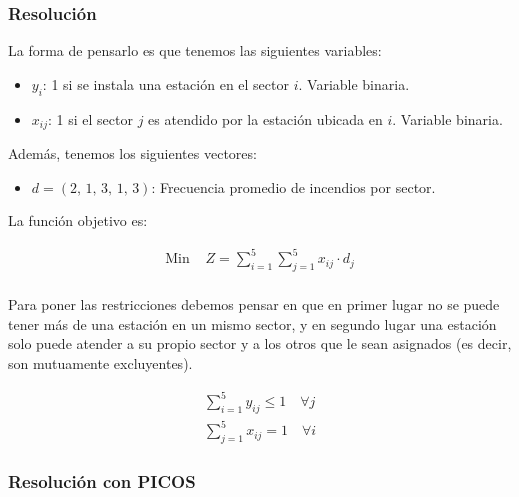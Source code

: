 \documentclass[12pt]{article}
\begin{document}
\subsubsection{Resolución}

La forma de pensarlo es que tenemos las siguientes variables:

\begin{itemize}[label=$\rightarrow$]
    \item $y_i$: 1 si se instala una estación en el sector $i$. Variable binaria.
    \item $x_{ij}$: 1 si el sector $j$ es atendido por la estación ubicada en $i$. Variable binaria.
\end{itemize}

Además, tenemos los siguientes vectores:

\begin{itemize}[label=$\rightarrow$]
    \item $d = (2,\,1,\,3,\,1,\,3)$: Frecuencia promedio de incendios por sector.
\end{itemize}

La función objetivo es:

\begin{align*}
    \text{Min } & Z = \sum_{i=1}^{5} \sum_{j=1}^{5} x_{ij} \cdot d_j \\
\end{align*}

Para poner las restricciones debemos pensar en que en primer lugar no se puede tener más de una estación en un mismo sector, y en segundo lugar una estación solo puede atender a su propio sector y a los otros que le sean asignados (es decir, son mutuamente excluyentes).

\begin{align*}
    \sum_{i=1}^{5} y_{ij} \le 1 \quad \forall j \\
    \sum_{j=1}^{5} x_{ij} = 1 \quad \forall i
\end{align*}

\subsubsection{Resolución con PICOS}
\end{document}
